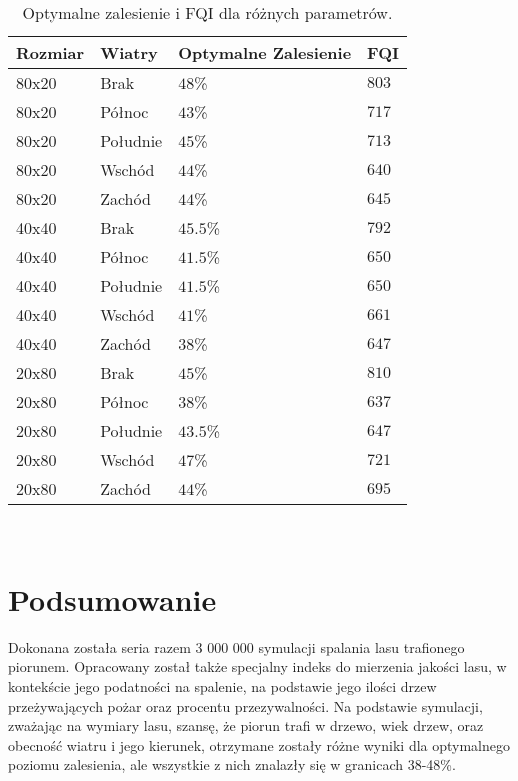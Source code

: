 \documentclass{article}
\begin{document}
\begin{table}[h]
\centering
\begin{tabular}{|l|l|l|l|}\hline
Rozmiar & Wiatry & Optymalne Zalesienie & FQI \\\hline
 80x20 & Brak & $48$\% & $803$\\\hline
 80x20 & Północ & $43$\% & $717$\\\hline
 80x20 & Południe & $45$\% & $713$ \\\hline
 80x20 & Wschód & $44$\% & $640$ \\\hline
 80x20 & Zachód & $44$\% & $645$ \\\hline
 40x40 & Brak & $45.5$\% & $792$ \\\hline
 40x40 & Północ & $41.5$\% & $650$ \\\hline
 40x40 & Południe & $41.5$\% & $650$ \\\hline
 40x40 & Wschód & $41$\% & $661$ \\\hline
 40x40 & Zachód & $38$\% & $647$ \\\hline
 20x80 & Brak & $45$\% & $810$ \\\hline
 20x80 & Północ & $38$\% & $637$ \\\hline
 20x80 & Południe & $43.5$\% & $647$ \\\hline
 20x80 & Wschód & $47$\% & $721$ \\\hline
 20x80 & Zachód & $44$\% & $695$ \\\hline
\end{tabular}
\caption{\label{tab:h1} Optymalne zalesienie i FQI dla różnych parametrów.}
\end{table}\\

\section{Podsumowanie}
Dokonana została seria razem 3 000 000 symulacji spalania lasu trafionego piorunem. Opracowany został także specjalny indeks do mierzenia jakości lasu, w kontekście jego podatności na spalenie, na podstawie jego ilości drzew przeżywających pożar oraz procentu przezywalności. Na podstawie symulacji, zważając na wymiary lasu, szansę, że piorun trafi w drzewo, wiek drzew, oraz obecność wiatru i jego kierunek, otrzymane zostały różne wyniki dla optymalnego poziomu zalesienia, ale wszystkie z nich znalazły się w granicach 38-48\%.
\\
\end{document}
